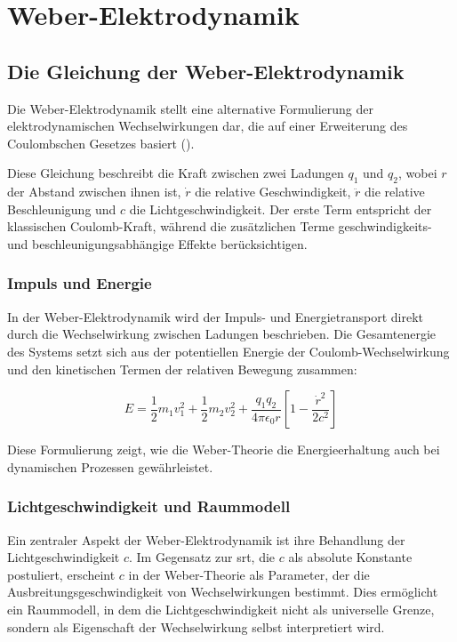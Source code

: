 \chapter{Weber-Elektrodynamik}
\section{Die Gleichung der Weber-Elektrodynamik}
Die Weber-Elektrodynamik stellt eine alternative Formulierung der elektrodynamischen Wechselwirkungen dar, die auf einer Erweiterung des Coulombschen Gesetzes basiert ().

Diese Gleichung beschreibt die Kraft zwischen zwei Ladungen $q_1$ und $q_2$, wobei $r$ der Abstand zwischen ihnen ist, $\dot{r}$ die relative Geschwindigkeit, $\ddot{r}$ die relative
Beschleunigung und $c$ die Lichtgeschwindigkeit. Der erste Term entspricht der klassischen Coulomb-Kraft, während die zusätzlichen Terme geschwindigkeits- und beschleunigungsabhängige
Effekte berücksichtigen.

\subsection{Impuls und Energie}
In der Weber-Elektrodynamik wird der Impuls- und Energietransport direkt durch die Wechselwirkung zwischen Ladungen beschrieben. Die Gesamtenergie des Systems setzt sich aus der potentiellen
Energie der Coulomb-Wechselwirkung und den kinetischen Termen der relativen Bewegung zusammen:

\begin{equation}
    E = \frac{1}{2} m_1 v_1^2 + \frac{1}{2} m_2 v_2^2 + \frac{q_1 q_2}{4 \pi \epsilon_0 r} \left[ 1 - \frac{\dot{r}^2}{2c^2} \right]    
\end{equation}

Diese Formulierung zeigt, wie die Weber-Theorie die Energieerhaltung auch bei dynamischen Prozessen gewährleistet.

\subsection{Lichtgeschwindigkeit und Raummodell}
Ein zentraler Aspekt der Weber-Elektrodynamik ist ihre Behandlung der Lichtgeschwindigkeit $c$. Im Gegensatz zur \gls{srt}, die $c$ als absolute Konstante postuliert,
erscheint $c$ in der Weber-Theorie als Parameter, der die Ausbreitungsgeschwindigkeit von Wechselwirkungen bestimmt. Dies ermöglicht ein Raummodell, in dem die Lichtgeschwindigkeit
nicht als universelle Grenze, sondern als Eigenschaft der Wechselwirkung selbst interpretiert wird.

